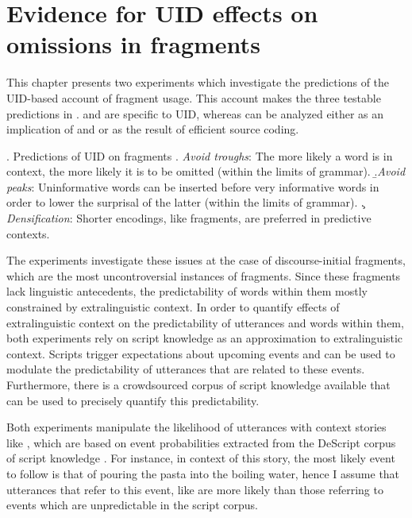 \chapter{Evidence for UID effects on omissions in fragments}
\label{sec:chapter-infotheory-experiments}

This chapter presents two experiments which investigate the predictions of the UID-based account of fragment usage. This account makes the three testable predictions in \Next. \Next[a] and \Next[b] are specific to UID, whereas \Next[c] can be analyzed either as an implication of \Next[a] and \Next[b] or as the result of efficient source coding.

\ex. Predictions of UID on fragments
\a. \textit{Avoid troughs}: The more likely a word is in context, the more likely it is to be omitted (within the limits of grammar).\label{ex:uid-pred-troughs}
 \b.\textit{Avoid peaks}: Uninformative words can be inserted before very informative words in order to lower the surprisal of the latter (within the limits of grammar). \label{ex:uid-pred-peaks}
 \c. \textit{Densification}: Shorter encodings, like fragments, are preferred in predictive contexts.\label{ex:uid-pred-density}

The experiments investigate these issues at the case of discourse-initial fragments, which are the most uncontroversial instances of fragments. Since these fragments lack linguistic antecedents, the predictability of words within them mostly constrained by extralinguistic context. In order to quantify effects of extralinguistic context on the predictability of utterances and words within them,  both experiments rely on script knowledge \citep{schank.abelson1977} as an approximation to extralinguistic context. Scripts trigger expectations about upcoming events and can be used to modulate the predictability of utterances that are related to these events. Furthermore, there is a crowdsourced corpus of script knowledge available that can be used to precisely quantify this predictability. 

Both experiments manipulate the likelihood of utterances with context stories like \Next, which are based on event probabilities extracted from the DeScript corpus of script knowledge \citep{wanzare.etal2016}. For instance, in context of this story, the most likely event to follow is that of pouring the pasta into the boiling water, hence I assume that utterances that refer to this event, like \Next[a] are more likely than those referring to events which are unpredictable in the script corpus.

